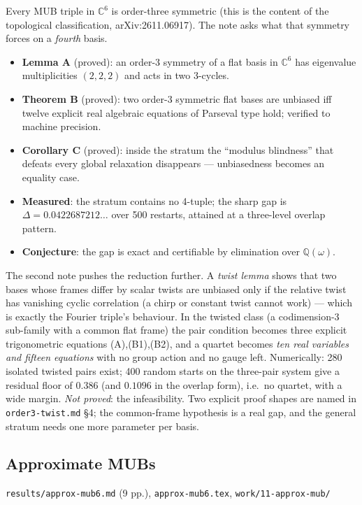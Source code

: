 \documentclass[10pt]{article}
\theoremstyle{definition}
\newcommand{\C}{\mathbb{C}}
\newcommand{\file}[1]{\texttt{\small #1}}
\begin{document}
Every MUB triple in $\C^6$ is order-three symmetric (this is the content of the topological
classification, arXiv:2611.06917). The note asks what that symmetry forces on a \emph{fourth} basis.
\begin{itemize}[leftmargin=1.2em,itemsep=1pt]
\item \textbf{Lemma A} (proved): an order-3 symmetry of a flat basis in $\C^6$ has eigenvalue
multiplicities $(2,2,2)$ and acts in two 3-cycles.
\item \textbf{Theorem B} (proved): two order-3 symmetric flat bases are unbiased iff twelve explicit
real algebraic equations of Parseval type hold; verified to machine precision.
\item \textbf{Corollary C} (proved): inside the stratum the ``modulus blindness'' that defeats every
global relaxation disappears --- unbiasedness becomes an equality case.
\item \textbf{Measured}: the stratum contains no 4-tuple; the sharp gap is $\Delta=0.0422687212\dots$
over 500 restarts, attained at a three-level overlap pattern.
\item \textbf{Conjecture}: the gap is exact and certifiable by elimination over $\mathbb{Q}(\omega)$.
\end{itemize}
The second note pushes the reduction further. A \emph{twist lemma} shows that two bases whose frames
differ by scalar twists are unbiased only if the relative twist has vanishing cyclic correlation
(a chirp or constant twist cannot work) --- which is exactly the Fourier triple's behaviour. In the
twisted class (a codimension-3 sub-family with a common flat frame) the pair condition becomes three
explicit trigonometric equations (A),(B1),(B2), and a quartet becomes \emph{ten real variables and
fifteen equations} with no group action and no gauge left. Numerically: 280 isolated twisted pairs
exist; 400 random starts on the three-pair system give a residual floor of $0.386$ (and $0.1096$ in
the overlap form), i.e.\ no quartet, with a wide margin. \emph{Not proved}: the infeasibility. Two
explicit proof shapes are named in \file{order3-\allowbreak{}twist.md} \S4; the common-frame hypothesis is a real
gap, and the general stratum needs one more parameter per basis.

\subsection{Approximate MUBs}
\file{results/\allowbreak{}approx-\allowbreak{}mub6.md} (9 pp.), \file{approx-\allowbreak{}mub6.tex}, \file{work/\allowbreak{}11-\allowbreak{}approx-\allowbreak{}mub/\allowbreak{}}
\end{document}
